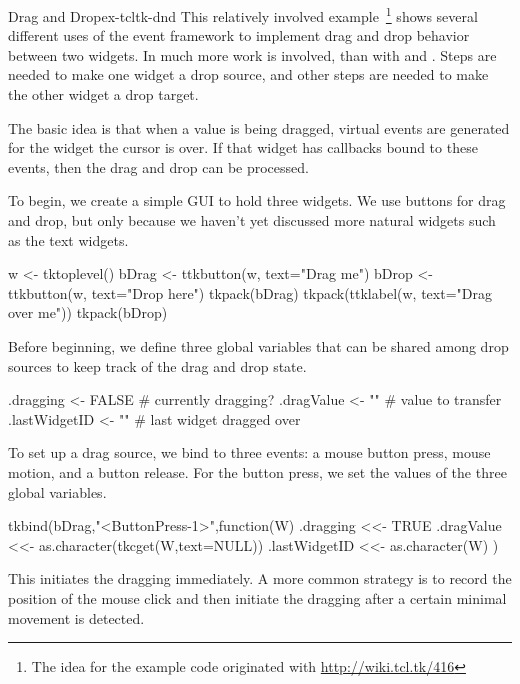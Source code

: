 \begin{example}{Drag and Drop}{ex-tcltk-dnd}
This relatively involved example~\footnote{The idea for the example
  code originated with \url{http://wiki.tcl.tk/416}} shows several
different uses of the event framework to implement drag and drop
behavior between two widgets. In  much more work is
involved, than with  and . Steps are needed to
make one widget a drop source, and other steps are needed to make the
other widget a drop target.

The basic idea is that when a value is being dragged, virtual events
are generated for the widget the cursor is over. If that widget has
callbacks bound to these events, then the drag and drop can be
processed.


To begin, we create a simple GUI to hold three widgets. We use buttons
for drag and drop, but only because we haven't yet discussed more
natural widgets such as the text widgets. 

\begin{Schunk}
\begin{Sinput}
 w <- tktoplevel()
 bDrag <- ttkbutton(w, text="Drag me")
 bDrop <- ttkbutton(w, text="Drop here")
 tkpack(bDrag)
 tkpack(ttklabel(w, text="Drag over me"))
 tkpack(bDrop)
\end{Sinput}
\end{Schunk}


Before beginning, we define three global variables that can be shared
among drop sources to keep track of the drag and drop state. 
\begin{Schunk}
\begin{Sinput}
 .dragging <- FALSE                 # currently dragging?
 .dragValue <- ""                   # value to transfer
 .lastWidgetID <- ""                # last widget dragged over
\end{Sinput}
\end{Schunk}
%
%
To set up a drag source, we bind to three events: a mouse button
press, mouse motion, and a button release. For the button press, we
set the values of the three global variables.
\begin{Schunk}
\begin{Sinput}
 tkbind(bDrag,"<ButtonPress-1>",function(W) {
   .dragging <<-  TRUE
   .dragValue <<- as.character(tkcget(W,text=NULL))
   .lastWidgetID <<- as.character(W)
 })
\end{Sinput}
\end{Schunk}
%
This initiates the dragging immediately. A more common strategy is to
record the position of the mouse click and then initiate the dragging
after a certain minimal movement is detected.


\end{example}
